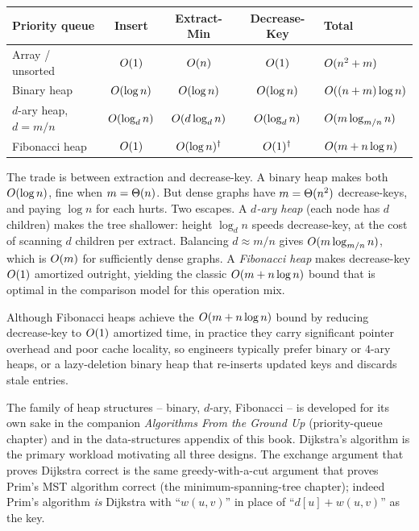 \begin{center}
\begin{tabular}{lcccl}
\toprule
Priority queue & Insert & Extract-Min & Decrease-Key & Total \\
\midrule
Array / unsorted    & $O(1)$ & $O(n)$ & $O(1)$ & $O(n^2 + m)$ \\
Binary heap         & $O(\log n)$ & $O(\log n)$ & $O(\log n)$ & $O((n+m)\log n)$ \\
$d$-ary heap, $d{=}m/n$ & $O(\log_d n)$ & $O(d\log_d n)$ & $O(\log_d n)$ & $O(m\log_{m/n} n)$ \\
Fibonacci heap      & $O(1)$ & $O(\log n)^\dagger$ & $O(1)^\dagger$ & $O(m + n\log n)$ \\
\bottomrule
\end{tabular}
\end{center}


\begin{intuitionbox}
The trade is between extraction and decrease-key. A binary heap makes both
$O(\log n)$, fine when $m=\Theta(n)$. But dense graphs have $m=\Theta(n^2)$ decrease-keys,
and paying $\log n$ for each hurts. Two escapes. A \emph{$d$-ary heap} (each node has $d$
children) makes the tree shallower: height $\log_d n$ speeds decrease-key, at the cost of
scanning $d$ children per extract. Balancing $d\approx m/n$ gives $O(m\log_{m/n}n)$,
which is $O(m)$ for sufficiently dense graphs. A \emph{Fibonacci heap} makes
decrease-key $O(1)$ amortized outright, yielding the classic $O(m+n\log n)$ bound that
is optimal in the comparison model for this operation mix.
\end{intuitionbox}

Although Fibonacci heaps achieve the $O(m+n\log n)$ bound by reducing decrease-key to
$O(1)$ amortized time, in practice they carry significant pointer overhead and poor cache
locality, so engineers typically prefer binary or $4$-ary heaps, or a lazy-deletion binary
heap that re-inserts updated keys and discards stale entries.

\begin{connectionbox}
The family of heap structures -- binary, $d$-ary, Fibonacci -- is developed for its own sake in the
companion \emph{Algorithms From the Ground Up} (priority-queue chapter) and in the
data-structures appendix of this book. Dijkstra's algorithm is the primary workload motivating all three designs. The exchange
argument that proves Dijkstra correct is the same greedy-with-a-cut argument that proves
Prim's MST algorithm correct (the minimum-spanning-tree chapter); indeed Prim's algorithm
\emph{is} Dijkstra with ``$w(u,v)$'' in place of ``$d[u]+w(u,v)$'' as the key.
\end{connectionbox}

